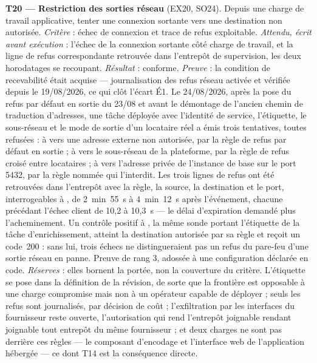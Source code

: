 \textbf{T20 --- Restriction des sorties réseau} (EX20, SO24). Depuis une charge de travail
applicative, tenter une connexion sortante vers une destination non autorisée. \emph{Critère} :
échec de connexion et trace de refus exploitable. \emph{Attendu, écrit avant exécution} : l'échec
de la connexion sortante côté charge de travail, et la ligne de refus correspondante retrouvée dans
l'entrepôt de supervision, les deux horodatages se recoupant. \emph{Résultat} : conforme.
\emph{Preuve} : la condition de recevabilité était acquise --- journalisation des refus réseau
activée et vérifiée depuis le 19/08/2026, ce qui clôt l'écart É1. Le 24/08/2026, après la pose du
refus par défaut en sortie du 23/08 et avant le démontage de l'ancien chemin de traduction
d'adresses, une tâche déployée avec l'identité de service, l'étiquette, le sous-réseau et le mode
de sortie d'un locataire réel a émis trois tentatives, toutes refusées : à  vers une
adresse externe non autorisée, par la règle de refus par défaut en sortie ; à  vers
le sous-réseau de la plateforme, par la règle de refus croisé entre locataires ; à 
vers l'adresse privée de l'instance de base sur le port 5432, par la règle nommée qui l'interdit.
Les trois lignes de refus ont été retrouvées dans l'entrepôt avec la règle, la source, la
destination et le port, interrogeables à , de 2~min~55~s à 4~min~12~s après l'événement,
chacune précédant l'échec client de 10,2 à 10,3~s --- le délai d'expiration demandé plus
l'acheminement. Un contrôle positif à , la même sonde portant l'étiquette de la tâche
d'enrichissement, atteint la destination autorisée par sa règle et reçoit un code~200 : sans lui,
trois échecs ne distingueraient pas un refus du pare-feu d'une sortie réseau en panne. Preuve de
rang 3, adossée à une configuration déclarée en code. \emph{Réserves} : elles bornent la portée, non la couverture du critère. L'étiquette se pose dans
la définition de la révision, de sorte que la frontière est opposable à une charge compromise mais
non à un opérateur capable de déployer ; seuls les refus sont journalisés, par décision de coût ;
l'exfiltration par les interfaces du fournisseur reste ouverte, l'autorisation qui rend l'entrepôt
joignable rendant joignable tout entrepôt du même fournisseur ; et deux charges ne sont pas
derrière ces règles --- le composant d'encodage et l'interface web de l'application hébergée ---
ce dont T14 est la conséquence directe.
